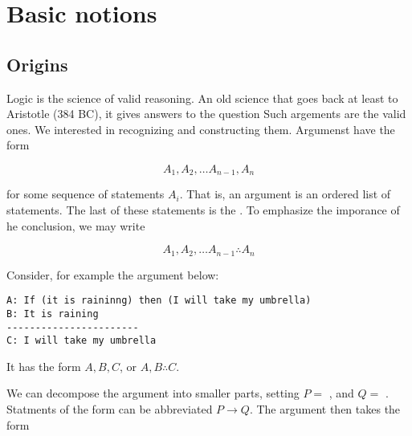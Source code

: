 

\begin{mathmacro}
\newcommand{\set}[1]{\{ #1 \}}
\newcommand{\for}[0]{\mathcal{F}}
\newcommand{\axioms}[0]{\mathcal{A}}
\newcommand{\theorems}[0]{\mathcal{T}}
\end{mathmacro}

\section{Basic notions}

\innertableofcontents


\subsection{Origins}

Logic is the science of valid reasoning.  An old science that goes back at least to Aristotle (384 BC), it gives answers to the question 
Such argements are the valid ones.  We interested in recognizing and constructing them. Argumenst have the form

\begin{equation}
\label{argument}
A_1, A_2, \ldots A_{n-1}, A_n
\end{equation}

for some sequence of statements $A_i$.  That is, an argument is an ordered list of statements.  The last of these statements is the .  To emphasize the imporance of he conclusion, we may write

\begin{equation}
\label{argument2}
A_1, A_2, \ldots A_{n-1} \therefore A_n
\end{equation}

Consider, for example the argument below:

\begin{verbatim}
A: If (it is raininng) then (I will take my umbrella)
B: It is raining
-----------------------
C: I will take my umbrella
\end{verbatim}

It has the form $A, B, C$, or $A, B \therefore C$.

We can  decompose the argument into smaller parts, setting $P =$ , and $Q =$ .  Statments of the form  can be abbreviated $P \to Q$.  The argument then takes the form



